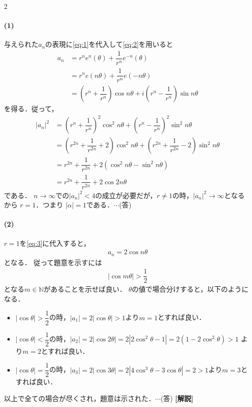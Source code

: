\documentclass[../../main.tex]{subfiles}
\begin{document}
\begin{multicols}{2}
  \paragraph{(1)}
  与えられた$a_n$の表現に\cref{eq:1}を代入して\cref{eq:2}を用いると
  \begin{align}
    a_n
    & = r^n e^{n}(\theta) + \dfrac{1}{r^n} e^{-n}(\theta)                                                              \\
    & = r^n e(n\theta) + \dfrac{1}{r^n} e(-n\theta)                                                                    \\
    & = \left(r^n+\dfrac{1}{r^n}\right) \cos n\theta + i\left(r^n-\dfrac{1}{r^n}\right)\sin n\theta \label{eq:3}
  \end{align}
  を得る．従って，
  \begin{align}
    |a_n|^2
    & = \left(r^n+\dfrac{1}{r^n}\right)^2 \cos^2 n\theta + \left(r^n-\dfrac{1}{r^n}\right)^2 \sin^2 n\theta           \\
    & = \left(r^{2n}+\dfrac{1}{r^{2n}}+2\right)\cos^2 n\theta + \left(r^{2n}+\dfrac{1}{r^{2n}}-2\right)\sin^2 n\theta \\
    & = r^{2n}+\dfrac{1}{r^{2n}}+2(\cos^2 n\theta - \sin^2 n\theta)                                                  \\
    & = r^{2n}+\dfrac{1}{r^{2n}}+2\cos 2n\theta
  \end{align}
  である．
  $n \to \infty$での$|a_n|^2 < 4$の成立が必要だが，$r \neq 1$の時，$|a_n|^2 \to \infty$となる
  から $r=1$．つまり $|\alpha|=1$である．$\cdots$(答)

  \paragraph{(2)}

  $r=1$を\cref{eq:3}に代入すると，
  \begin{align}
    a_n = 2\cos n\theta
  \end{align}
  となる．
  従って題意を示すには
  \begin{align}
    |\cos m\theta|> \dfrac{1}{2}
  \end{align}
  となる$m \in \mathbb{N}$があることを示せば良い．
  $\theta$の値で場合分けすると，以下のようになる．
  \begin{itemize}
    \item $|\cos\theta| > \dfrac{1}{2}$の時，$|a_1|=2|\cos\theta|>1$より$m=1$とすれば良い．
    \item $|\cos\theta| < \dfrac{1}{2}$の時，$|a_2| = 2|\cos 2\theta| = 2|2\cos^2\theta - 1| = 2(1-2\cos^2\theta)> 1$ より$m=2$とすれば良い．
    \item $|\cos\theta| = \dfrac{1}{2}$の時，$|a_3| = 2|\cos 3\theta| = 2|4\cos^3\theta - 3\cos\theta| = 2 > 1 $より$m=3$とすれば良い．
  \end{itemize}
  以上で全ての場合が尽くされ，題意は示された．$\cdots$(答)
  {\bf [解説]}


\end{multicols}
\end{document}
